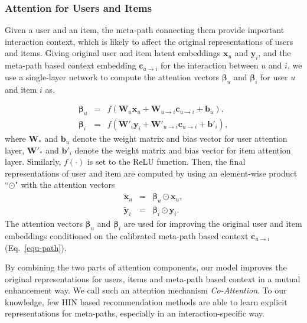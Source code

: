 \subsubsection{Attention for Users and Items}
Given a user and an item, the meta-path connecting them provide important interaction context, which is likely to affect the original  representations
of users and items.  Giving  original user and item latent embeddings $\mathbf{x}_u$ and $\mathbf{y}_i$,
and the meta-path based context  embedding $\mathbf{c}_{u \rightarrow i}$ for the interaction between $u$ and $i$,
we use a single-layer network to compute the attention vectors $\bm{\beta}_u$ and $\bm{\beta}_i$  for user $u$ and item $i$ as,

\begin{eqnarray}
\bm{\beta}_u &=& f(\mathbf{W}_{u} \mathbf{x}_u + \mathbf{W}_{u \rightarrow i} \mathbf{c}_{u \rightarrow i} + \mathbf{b}_{u}), \label{equ-userattention}\\
\bm{\beta}_i &=& f(\mathbf{W}'_{i} \mathbf{y}_i + \mathbf{W}'_{u \rightarrow i} \mathbf{c}_{u \rightarrow i}+ \mathbf{b}'_{i}) \label{equ-itemattention},
\end{eqnarray}
where $\mathbf{W}_*$ and $\mathbf{b}_u$ denote the weight matrix and bias vector for user attention layer, $\mathbf{W}'_*$ and $\mathbf{b}'_i$ denote the weight matrix and bias vector for item attention layer. Similarly, $f(\cdot)$ is set to the ReLU function. Then, the final representations of user and item are computed by using an element-wise product ``$\odot$" with the attention vectors
\begin{eqnarray}
\tilde{\mathbf{x}}_u &=& \bm{\beta}_u \odot \mathbf{x}_u, \label{equ-user}\\
\tilde{\mathbf{y}}_i &=& \bm{\beta}_i \odot \mathbf{y}_i. \label{equ-item}
\end{eqnarray}
The attention vectors $\bm{\beta}_u$ and $\bm{\beta}_i$ are used for improving the original user and item embeddings conditioned on the calibrated meta-path based context $\mathbf{c}_{u \rightarrow i}$ (Eq.~\ref{equ-path}).

By combining the two parts of attention components, our model improves the original representations for users, items and meta-path based context in a mutual enhancement way.  We call such an attention mechanism \emph{Co-Attention}.
To our knowledge, few HIN based recommendation methods are able to learn explicit representations for meta-paths, especially in an interaction-specific way.


